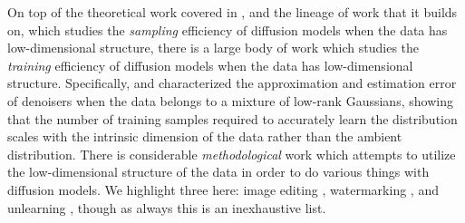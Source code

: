 \documentclass[../../book-main.tex]{subfiles}
\begin{document}


On top of the theoretical work \citep{li2024d} covered in , and the lineage of work that it builds on, which studies the \textit{sampling} efficiency of diffusion models when the data has low-dimensional structure, there is a large body of work which studies the \textit{training} efficiency of diffusion models when the data has low-dimensional structure. Specifically, \citet{chen2023score} and \citep{wang2024diffusion} characterized the approximation and estimation error of denoisers when the data belongs to a mixture of low-rank Gaussians, showing that the number of training samples required to accurately learn the distribution scales with the intrinsic dimension of the data rather than the ambient distribution. There is considerable \textit{methodological} work which attempts to utilize the low-dimensional structure of the data in order to do various things with diffusion models. We highlight three here: image editing \citep{chen2024exploring}, watermarking \citep{li2024shallow}, and unlearning \citep{chen2025dual}, though as always this is an inexhaustive list.
 
\end{document}
